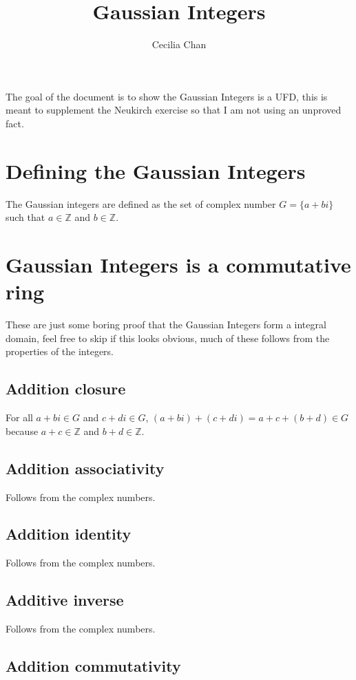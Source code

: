 \documentclass{article}
\title{Gaussian Integers}
\author{Cecilia Chan}
\begin{document}
\maketitle

The goal of the document is to show the Gaussian Integers is a UFD, this is meant to supplement the Neukirch exercise so that I am not using an unproved fact.

\section*{Defining the Gaussian Integers}
The Gaussian integers are defined as the set of complex number $ G = \{a + bi\} $ such that $ a \in \mathbb{Z} $ and $ b \in \mathbb{Z} $.

\section*{Gaussian Integers is a commutative ring}
These are just some boring proof that the Gaussian Integers form a integral domain, feel free to skip if this looks obvious, much of these follows from the properties of the integers.

\subsection*{Addition closure}
For all $ a + bi \in G $ and $ c + di \in G $, $ (a + bi) + (c + di) = a + c + (b + d) \in G $ because $ a + c \in \mathbb{Z} $ and $ b + d \in \mathbb{Z} $.

\subsection*{Addition associativity}

Follows from the complex numbers.

\subsection*{Addition identity}

Follows from the complex numbers.

\subsection*{Additive inverse}

Follows from the complex numbers.

\subsection*{Addition commutativity}
\end{document}

